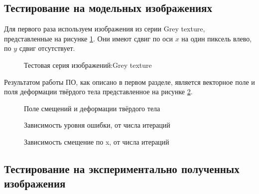 \subsection{Тестирование на модельных изображениях}

Для первого раза используем изображения из серии Grey texture, представленные на рисунке \ref{pic:gray_set}. Они имеют сдвиг по оси $x$ на один пиксель влево, по $y$ сдвиг отсутствует.

\begin{figure}[ht]
\caption{Тестовая серия изображений:Grey texture}
\label{pic:gray_set}
\end{figure}

Результатом работы ПО, как описано в первом разделе, является векторное поле и поля деформации твёрдого тела представленное на рисунке \ref{pic:gray_set_out}.

\begin{figure}[ht]
\caption{Поле смещений и деформации твёрдого тела}
\label{pic:gray_set_out}
\end{figure}

\begin{figure}[ht]
\caption{Зависимость уровня ошибки, от числа итераций}
\label{pic:gray_set_func_iteration}
\end{figure}

\begin{figure}[ht]
\caption{Зависимость смещение по x, от числа итераций}
\label{pic:gray_set_func_iter_vector}
\end{figure}

\subsection{Тестирование на экспериментально полученных изображения}